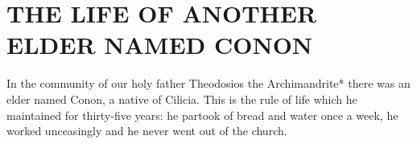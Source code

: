 \chapter{THE LIFE OF ANOTHER ELDER NAMED CONON}

In the community of our holy father Theodosios the Archimandrite* there was an elder named Conon, a native of Cilicia.
This is the rule of life which he maintained for thirty-five years: he partook of bread and water once a week, he worked unceasingly and he never went out of the church.
